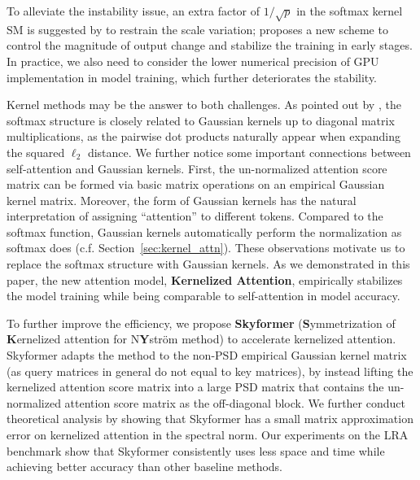 To alleviate the instability issue, an extra factor of $1 / \sqrt{p}$ in the softmax kernel $\text{SM}$ is suggested by \citet{DBLP:conf/nips/VaswaniSPUJGKP17} to restrain the scale variation;
\citet{DBLP:conf/emnlp/LiuLGCH20} proposes a new scheme to control the magnitude of output change and stabilize the training in early stages.
In practice, we also need to consider the lower numerical precision of GPU implementation in model training, which further deteriorates the stability.


Kernel methods may be the answer to both challenges.
As pointed out by \citet{DBLP:journals/corr/abs-2009-14794}, 
the softmax structure is closely related to Gaussian kernels up to diagonal matrix multiplications,
as the pairwise dot products naturally appear when expanding the squared $\ell_2$ distance.
We further notice some important connections between self-attention and Gaussian kernels.
First, the un-normalized attention score matrix can be formed via basic matrix operations on an empirical Gaussian kernel matrix.
Moreover, the form of Gaussian kernels has the natural interpretation of  assigning ``attention'' to different tokens.
Compared to the softmax function, Gaussian kernels automatically perform the normalization as softmax does (c.f. Section~\ref{sec:kernel_attn}).
These observations motivate us to replace the softmax structure with Gaussian kernels.
As we demonstrated in this paper, the new attention model, \textbf{Kernelized Attention}, empirically stabilizes the model training while being comparable to self-attention in model accuracy.

To further improve the efficiency, we propose \textbf{Skyformer} (\textbf{S}ymmetrization of \textbf{K}ernelized attention for N\textbf{Y}str\"om method) to accelerate kernelized attention.
Skyformer adapts the \nystrom method \citep{williams2001using, drineas2005nystrom} to the non-PSD empirical Gaussian kernel matrix
(as query matrices in general do not equal to key matrices), 
by instead lifting the kernelized attention score matrix into a large PSD matrix that contains the un-normalized attention score matrix as the off-diagonal block.
We further conduct theoretical analysis by showing that Skyformer has a small matrix approximation error on kernelized attention in the spectral norm.
Our experiments on the LRA benchmark show that Skyformer consistently uses less space and time while achieving better accuracy than other baseline methods.


